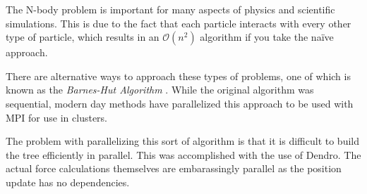 The N-body problem is important for many aspects of physics and scientific simulations. This is due to the fact that each particle interacts with every other type of particle, which results in an $\mathcal{O}\left( n^{2}\right)$ algorithm if you take the na\"{i}ve approach.

There are alternative ways to approach these types of problems, one of which is known as the {\em Barnes-Hut Algorithm} \cite{barneshut}. While the original algorithm was sequential, modern day methods have parallelized this approach to be used with MPI for use in clusters.

The problem with parallelizing this sort of algorithm is that it is difficult to build the tree efficiently in parallel. This was accomplished with the use of {\sc Dendro}. The actual force calculations themselves are embarassingly parallel as the position update has no dependencies. 